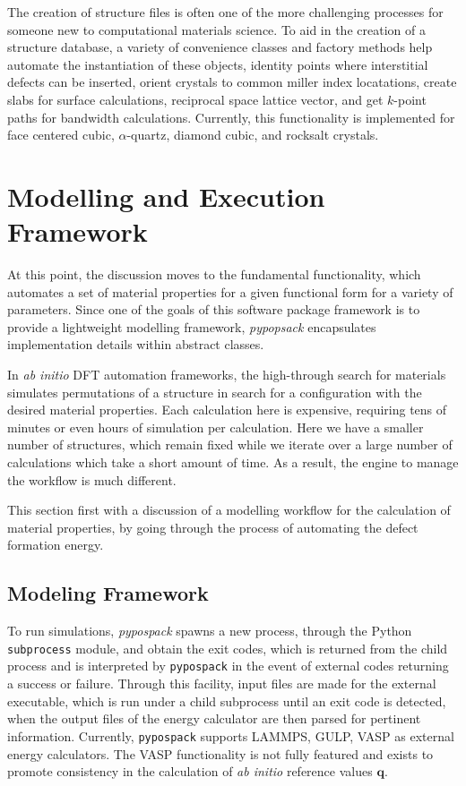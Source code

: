 The creation of structure files is often one of the more challenging processes for someone new to computational materials science.  To aid in the creation of a structure database, a variety of convenience classes and factory methods help automate the instantiation of these objects, identity points where interstitial defects can be inserted, orient crystals to common miller index locatations, create slabs for surface calculations, reciprocal space lattice vector, and get $k$-point paths for bandwidth calculations.  Currently, this functionality is implemented for face centered cubic, $\alpha$-quartz, diamond cubic, and rocksalt crystals.

\section{Modelling and Execution Framework}
\label{sec:potential_evalaution}

At this point, the discussion moves to the fundamental functionality, which automates a set of material properties for a given functional form for a variety of parameters.  Since one of the goals of this software package framework is to provide a lightweight modelling framework, \emph{pypopsack} encapsulates implementation details within abstract classes.

In \emph{ab initio} DFT automation frameworks, the high-through search for materials simulates permutations of a structure in search for a configuration with the desired material properties.  Each calculation here is expensive, requiring tens of minutes or even hours of simulation per calculation.  Here we have a smaller number of structures, which remain fixed while we iterate over a large number of calculations which take a short amount of time.  As a result, the engine to manage the workflow is much different.

This section first with a discussion of a modelling workflow for the calculation of material properties, by going through the process of automating the defect formation energy.

\subsection{Modeling Framework}

To run simulations, \emph{pypospack} spawns a new process, through the Python \verb|subprocess| module, and obtain the exit codes, which is returned from the child process and is interpreted by \verb|pypospack| in the event of external codes returning a success or failure.  Through this facility, input files are made for the external executable, which is run under a child subprocess until an exit code is detected, when the output files of the energy calculator are then parsed for pertinent information.  Currently, \verb|pypospack| supports LAMMPS, GULP, VASP as external energy calculators.  The VASP functionality is not fully featured and exists to promote consistency in the calculation of \emph{ab initio} reference values $\bm{q}$.

